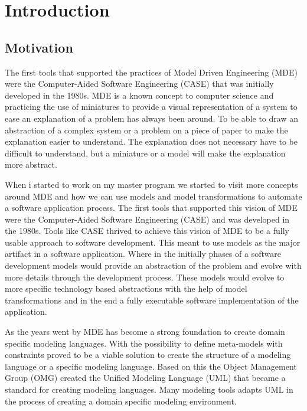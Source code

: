 \chapter{Introduction} %

\label{introduction} %

\singlespacing

\section{Motivation}

The first tools that supported the practices of Model Driven Engineering (MDE)
were the Computer-Aided Software Engineering\cite{premkumar1995adoption} (CASE)
that was initially developed in the 1980s. MDE is a known concept to computer
science and practicing the use of miniatures to provide a visual representation
of a system to ease an explanation of a problem has always been around. To be
able to draw an abstraction of a complex system or a problem on a piece of
paper to make the explanation easier to understand. The explanation does not
necessary have to be difficult to understand, but a miniature or a model will
make the explanation more abstract.

When i started to work on my master program we started to visit more concepts
around MDE and how we can use models and model transformations to automate a
software application process. The first tools that supported this vision of MDE
were the Computer-Aided Software Engineering (CASE) and was developed in the
1980s. Tools like CASE thrived to achieve this vision of MDE to be a fully
usable approach to software development. This meant to use models as the major
artifact in a software application. Where in the initially phases of a
software development models would provide an abstraction of the problem and
evolve with more details through the development process. These models would
evolve to more specific technology based abstractions with the help of model
transformations and in the end a fully executable software implementation of
the application.

As the years went by MDE has become a strong foundation to create domain
specific modeling languages. With the possibility to define meta-models with
constraints proved to be a viable solution to create the structure of a
modeling language or a specific modeling language. Based on this the Object
Management Group (OMG) created the Unified Modeling Language\cite{UML_SPEC}
(UML) that became a standard for creating modeling languages. Many modeling
tools adapts UML in the process of creating a domain specific modeling
environment.

